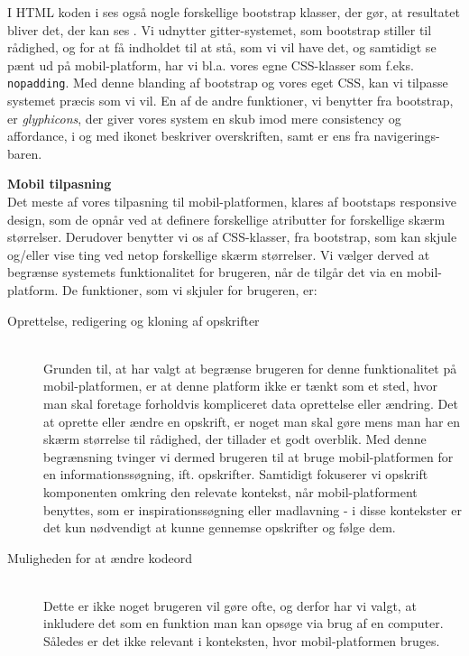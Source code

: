 I HTML koden i  ses også nogle forskellige bootstrap klasser, der gør, at resultatet bliver det, der kan ses . 
Vi udnytter gitter-systemet, som bootstrap stiller til rådighed, og for at få indholdet til at stå, som vi vil have det, og samtidigt se pænt ud på mobil-platform, har vi bl.a. vores egne CSS-klasser som f.eks. \texttt{nopadding}. 
Med denne blanding af bootstrap og vores eget CSS, kan vi tilpasse systemet præcis som vi vil. 
En af de andre funktioner, vi benytter fra bootstrap, er \textit{glyphicons}, der giver vores system en skub imod mere consistency og affordance, i og med ikonet beskriver overskriften, samt er ens fra navigerings-baren.

\textbf{Mobil tilpasning}\hfill\\
Det meste af vores tilpasning til mobil-platformen, klares af bootstaps responsive design, som de opnår ved at definere forskellige atributter for forskellige skærm størrelser.
Derudover benytter vi os af CSS-klasser, fra bootstrap, som kan skjule og/eller vise ting ved netop forskellige skærm størrelser.
Vi vælger derved at begrænse systemets funktionalitet for brugeren, når de tilgår det via en mobil-platform. De funktioner, som vi skjuler for brugeren, er:

\begin{description}
\item[Oprettelse, redigering og kloning af opskrifter]\hfill\\
Grunden til, at har valgt at begrænse brugeren for denne funktionalitet på mobil-platformen, er at denne platform ikke er tænkt som et sted, hvor man skal foretage forholdvis kompliceret data oprettelse eller ændring.
Det at oprette eller ændre en opskrift, er noget man skal gøre mens man har en skærm størrelse til rådighed, der tillader et godt overblik.
Med denne begrænsning tvinger vi dermed brugeren til at bruge mobil-platformen for en informationssøgning, ift. opskrifter.
Samtidigt fokuserer vi opskrift komponenten omkring den relevate kontekst, når mobil-platforment benyttes, som er inspirationssøgning eller madlavning - i disse kontekster er det kun nødvendigt at kunne gennemse opskrifter og følge dem.
\item[Muligheden for at ændre kodeord]\hfill\\
Dette er ikke noget brugeren vil gøre ofte, og derfor har vi valgt, at inkludere det som en funktion man kan opsøge via brug af en computer.
Således er det ikke relevant i konteksten, hvor mobil-platformen bruges.
\end{description}

